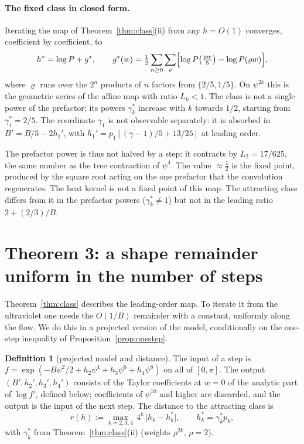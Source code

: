 \documentclass[11pt,a4paper]{article}
\theoremstyle{definition}
\newtheorem{definition}[lemma]{Definition}
\theoremstyle{remark}
\begin{document}
\paragraph{The fixed class in closed form.}
Iterating the map of Theorem~\ref{thm:class}(ii) from any $h=O(1)$ converges, coefficient by coefficient, to
\[
h^*=\log P+g^*,\qquad g^*(w)=\tfrac12\sum_{n\ge0}\sum_{\varrho}\Bigl[\log P\bigl(\tfrac{\varrho w}5\bigr)-\log P(\varrho w)\Bigr],
\]
where $\varrho$ runs over the $2^n$ products of $n$ factors from $\{2/5,1/5\}$.
On $\psi^{2k}$ this is the geometric series of the affine map with ratio $L_k<1$.
The class is not a single power of the prefactor: its powers $\gamma_k^*$ increase with $k$ towards $1/2$, starting from $\gamma_1^*=2/5$.
The coordinate $\gamma_1$ is not observable separately: it is absorbed in $B'=B/5-2h_1'$, with $h_1'=p_1[(\gamma-1)/5+13/25]$ at leading order.

The prefactor power is thus not halved by a step: it contracts by $L_2=17/625$, the same number as the tree contraction of $\psi^4$.
The value $\approx\tfrac12$ is the fixed point, produced by the square root acting on the one prefactor that the convolution regenerates.
The heat kernel is not a fixed point of this map.
The attracting class differs from it in the prefactor powers ($\gamma_k^*\ne1$) but not in the leading ratio $2+(2/3)/B$.

\section{Theorem 3: a shape remainder uniform in the number of steps}\label{sec:thm3}

Theorem~\ref{thm:class} describes the leading-order map.
To iterate it from the ultraviolet one needs the $O(1/B)$ remainder with a constant, uniformly along the flow.
We do this in a projected version of the model, conditionally on the one-step inequality of Proposition~\ref{prop:onestep}.

\begin{definition}[projected model and distance]\label{def:proj}
The input of a step is $f=\exp(-B\psi^2/2+h_2\psi^4+h_3\psi^6+h_4\psi^8)$ on all of $[0,\pi]$.
The output $(B',h_2',h_3',h_4')$ consists of the Taylor coefficients at $w=0$ of the analytic part of $\log f'$, defined below; coefficients of $\psi^{10}$ and higher are discarded, and the output is the input of the next step.
The distance to the attracting class is
\[
r(h):=\max_{k=2,3,4}\,4^k\,\bigl|h_k-h_k^*\bigr|,\qquad h_k^*=\gamma_k^*p_k ,
\]
with $\gamma_k^*$ from Theorem~\ref{thm:class}(ii) (weights $\rho^{2k}$, $\rho=2$).
\end{definition}
\end{document}
